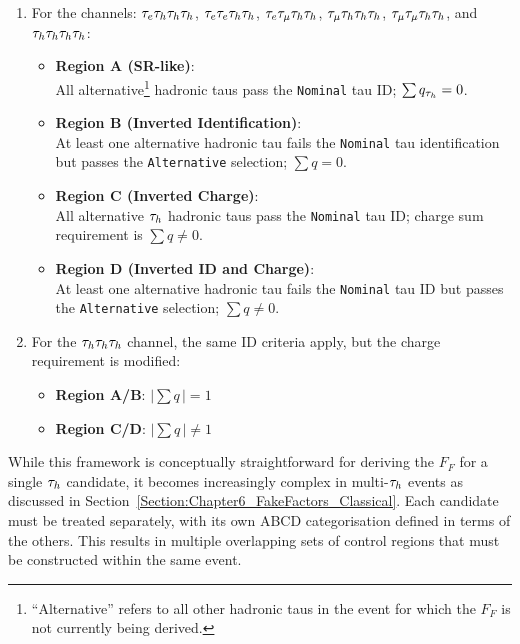 \begin{enumerate}[label=(\roman*)]
    \item For the channels: $\tau_e\tau_h\tau_h\tau_h$, $\tau_e\tau_e\tau_h\tau_h$, $\tau_e\tau_\mu\tau_h\tau_h$, $\tau_\mu\tau_h\tau_h\tau_h$, $\tau_\mu\tau_\mu\tau_h\tau_h$, and $\tau_h\tau_h\tau_h\tau_h$:
    \begin{itemize}
    \item \textbf{Region A (\ac{SR}-like)}: \\
    All alternative\footnote{``Alternative'' refers to all other hadronic taus in the event for which the $F_F$ is not currently being derived.} hadronic taus pass the \texttt{Nominal} tau ID; $\sum q_{\tau_h} = 0$.

    \item \textbf{Region B (Inverted Identification)}: \\
    At least one alternative hadronic tau fails the \texttt{Nominal} tau identification but passes the \texttt{Alternative} selection; $\sum q = 0$.

    \item \textbf{Region C (Inverted Charge)}: \\
    All alternative $\tau_h$ hadronic taus pass the \texttt{Nominal} tau ID; charge sum requirement is $\sum q \neq 0$.

    \item \textbf{Region D (Inverted ID and Charge)}: \\
    At least one alternative hadronic tau fails the \texttt{Nominal} tau ID but passes the \texttt{Alternative} selection; $\sum q \neq 0$.
    \end{itemize}

    \item For the $\tau_h\tau_h\tau_h$ channel, the same ID criteria apply, but the charge requirement is modified:
    \begin{itemize}
        \item \textbf{Region A/B}: $|\sum q \,| = 1$
        \item \textbf{Region C/D}: $|\sum q\,| \neq 1$
    \end{itemize}
\end{enumerate}

While this framework is conceptually straightforward for deriving the $F_F$ for a single $\tau_h$ candidate, it becomes increasingly complex in multi-$\tau_h$ events as discussed in Section~\ref{Section:Chapter6_FakeFactors_Classical}. Each candidate must be treated separately, with its own ABCD categorisation defined in terms of the others. This results in multiple overlapping sets of control regions that must be constructed within the same event.

